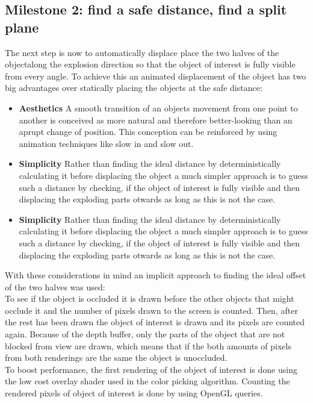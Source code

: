 \subsection{Milestone 2: find a safe distance, find a split plane} 
The next step is now to automatically displace place the two halves of the objectalong the explosion direction so that the object of interest is fully visible from every angle. To achieve this an animated displacement of the object has two big advantages over statically placing the objects at the safe distance:\\
\begin{itemize}
\item \textbf{Aesthetics} A smooth transition of an objects movement from one point to another is conceived as more natural and therefore better-looking than an aprupt change of position. This conception can be reinforced by using animation techniques like slow in and slow out.\cite{misc:siggraphAnim}
\item \textbf{Simplicity} Rather than finding the ideal distance by deterministically calculating it before displacing the object a much simpler approach is to guess such a distance by checking, if the object of interest is fully visible and then displacing the exploding parts otwards as long as this is not the case.
\item \textbf{Simplicity} Rather than finding the ideal distance by deterministically calculating it before displacing the object a much simpler approach is to guess such a distance by checking, if the object of interest is fully visible and then displacing the exploding parts otwards as long as this is not the case.
\end{itemize}
With these considerations in mind an implicit approach to finding the ideal offset of the two halves was used:\\
To see if the object is occluded it is drawn before the other objects that might occlude it and the number of pixels drawn to the screen is counted. Then, after the rest has been drawn the object of interest is drawn and its pixels are counted again. Because of the depth buffer, only the parts of the object that are not blocked from view are drawn, which means that if the both amounts of pixels from both renderings are the same the object is unoccluded.\\
To boost performance, the first rendering of the object of interest is done using the low cost overlay shader used in the color picking algorithm. Counting the rendered pixels of object of interest is done by using OpenGL queries. \\
